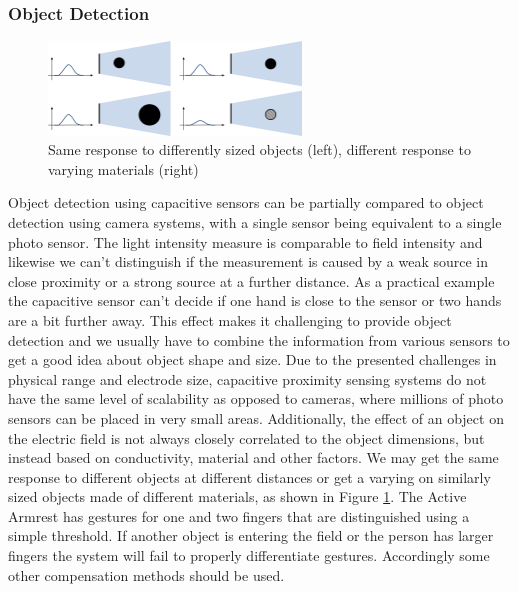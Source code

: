 \subsubsection{Object Detection}
\begin{figure}[h]
\centering
\includegraphics[width=0.6\textwidth]{images/limit_detection.png}
\caption{Same response to differently sized objects (left), different response to varying materials (right)}
\label{fig:disc_obj_detection}
\end{figure}
Object detection using capacitive sensors can be partially compared to object detection using camera systems, with a single sensor being equivalent to a single photo sensor. The light intensity measure is comparable to field intensity and likewise we can't distinguish if the measurement is caused by a weak source in close proximity or a strong source at a further distance. As a practical example the capacitive sensor can't decide if one hand is close to the sensor or two hands are a bit further away. This effect makes it challenging to provide object detection and we usually have to combine the information from various sensors to get a good idea about object shape and size. Due to the presented challenges in physical range and electrode size, capacitive proximity sensing systems do not have the same level of scalability as opposed to cameras, where millions of photo sensors can be placed in very small areas. 
Additionally, the effect of an object on the electric field is not always closely correlated to the object dimensions, but instead based on conductivity, material and other factors. We may get the same response to different objects at different distances or get a varying on similarly sized objects made of different materials, as shown in Figure \ref{fig:disc_obj_detection}. 
The Active Armrest has gestures for one and two fingers that are distinguished using a simple threshold. If another object is entering the field or the person has larger fingers the system will fail to properly differentiate gestures. Accordingly some other compensation methods should be used.
